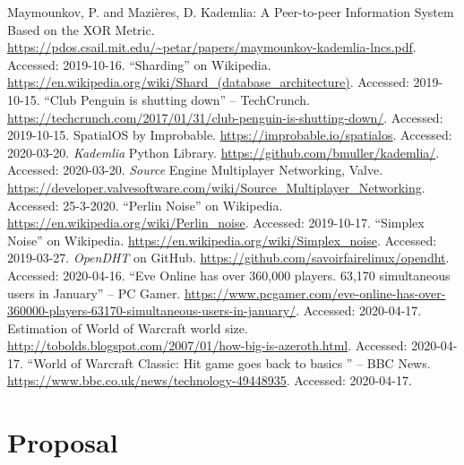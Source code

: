 \documentclass[10pt,twoside,notitlepage,a4paper]{report}
\begin{document}
	\begin{thebibliography}{9}
		 Maymounkov, P. and Mazières, D. Kademlia: A Peer-to-peer Information System Based on the XOR Metric. \url{https://pdos.csail.mit.edu/~petar/papers/maymounkov-kademlia-lncs.pdf}. Accessed: 2019-10-16.
		 ``Sharding'' on Wikipedia. \url{https://en.wikipedia.org/wiki/Shard_(database_architecture)}. Accessed: 2019-10-15.
		 ``Club Penguin is shutting down'' -- TechCrunch. \url{https://techcrunch.com/2017/01/31/club-penguin-is-shutting-down/}. Accessed: 2019-10-15.
		 SpatialOS by Improbable. \url{https://improbable.io/spatialos}. Accessed: 2020-03-20.
		 \emph{Kademlia} Python Library. \url{https://github.com/bmuller/kademlia/}. Accessed: 2020-03-20.
		 \emph{Source} Engine Multiplayer Networking, Valve. \url{https://developer.valvesoftware.com/wiki/Source_Multiplayer_Networking}. Accessed: 25-3-2020.
		 ``Perlin Noise'' on Wikipedia. \url{https://en.wikipedia.org/wiki/Perlin_noise}. Accessed: 2019-10-17.
		 ``Simplex Noise'' on Wikipedia.
		\url{https://en.wikipedia.org/wiki/Simplex_noise}. Accessed: 2019-03-27.
		 \emph{OpenDHT} on GitHub. \url{https://github.com/savoirfairelinux/opendht}. Accessed: 2020-04-16.
		 ``Eve Online has over 360,000 players. 63,170 simultaneous users in January'' -- PC Gamer. \url{https://www.pcgamer.com/eve-online-has-over-360000-players-63170-simultaneous-users-in-january/}. Accessed: 2020-04-17.
		 Estimation of World of Warcraft world size. \url{http://tobolds.blogspot.com/2007/01/how-big-is-azeroth.html}. Accessed: 2020-04-17.
		 ``World of Warcraft Classic: Hit game goes back to basics
		'' -- BBC News. \url{https://www.bbc.co.uk/news/technology-49448935}. Accessed: 2020-04-17.
	\end{thebibliography}
	\cleardoublepage
	
	\appendix
	
	\chapter{Proposal}
\end{document}

